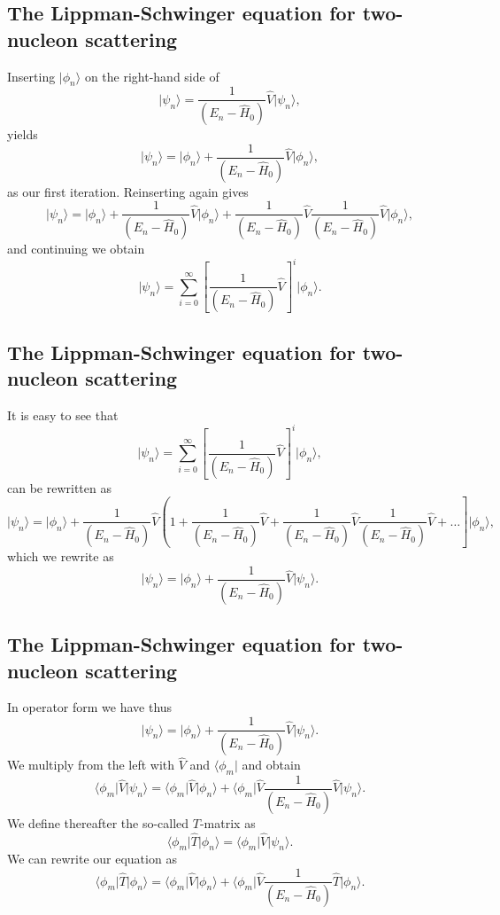 \documentclass[%
twoside,                 %
final,                   %
10pt]{article}
\begin{document}
\subsection{The Lippman-Schwinger equation for two-nucleon scattering}
\begin{block}{}
Inserting  $\vert\phi_n \rangle$  on the right-hand side of 
\[
\vert \psi_n \rangle =\frac{1}{( E_n -\hat{H}_0)}\hat{V}\vert \psi_n \rangle,
\]
yields
\[
\vert \psi_n \rangle =\vert\phi_n \rangle+\frac{1}{\left( E_n -\hat{H}_0\right)}\hat{V}\vert \phi_n \rangle,
\]
as our first iteration. 
Reinserting again gives
\[
\vert \psi_n \rangle =\vert\phi_n \rangle+\frac{1}{\left( E_n -\hat{H}_0\right)}\hat{V}\vert \phi_n \rangle+\frac{1}{( E_n -\hat{H}_0)}\hat{V}\frac{1}{\left( E_n -\hat{H}_0\right)}\hat{V}\vert \phi_n \rangle,
\]
and continuing we obtain
\[
\vert \psi_n \rangle =\sum_{i=0}^{\infty}\left[\frac{1}{( E_n -\hat{H}_0)}\hat{V}\right]^i\vert \phi_n \rangle.
\]
\end{block}

\subsection{The Lippman-Schwinger equation for two-nucleon scattering}
\begin{block}{}
It is easy to see that 
\[
\vert \psi_n \rangle =\sum_{i=0}^{\infty}\left[\frac{1}{(E_n -\hat{H}_0)}\hat{V}\right]^i\vert \phi_n \rangle,
\]
can be rewritten as 
\[
\vert \psi_n \rangle =\vert\phi_n \rangle+\frac{1}{( E_n -\hat{H}_0)}
\hat{V}\left(1+ \frac{1}{(E_n -\hat{H}_0)}\hat{V}+\frac{1}{(E_n -\hat{H}_0)}\hat{V}\frac{1}{(E_n -\hat{H}_0)}\hat{V}+\dots\right]\vert \phi_n \rangle,
\]
which we rewrite as 
\[
\vert \psi_n \rangle =\vert\phi_n \rangle+\frac{1}{(E_n -\hat{H}_0)}\hat{V}\vert \psi_n \rangle.
\]
\end{block}

\subsection{The Lippman-Schwinger equation for two-nucleon scattering}
\begin{block}{}
In operator form we have thus
\[
\vert \psi_n \rangle =\vert\phi_n \rangle+\frac{1}{(E_n -\hat{H}_0)}\hat{V}\vert \psi_n \rangle.
\]
We multiply from the left with $\hat{V}$ and $\langle \phi_m \vert$ and obtain
\[
\langle \phi_m \vert\hat{V}\vert \psi_n \rangle =\langle \phi_m \vert\hat{V}\vert\phi_n \rangle+\langle \phi_m \vert\hat{V}\frac{1}{(E_n -\hat{H}_0)}\hat{V}\vert \psi_n \rangle.
\]
We define thereafter the so-called $T$-matrix as
\[
\langle \phi_m \vert\hat{T}\vert \phi_n \rangle=\langle \phi_m \vert\hat{V}\vert \psi_n \rangle.
\]
We can rewrite our equation as
\[
\langle \phi_m \vert\hat{T}\vert \phi_n \rangle =\langle \phi_m \vert\hat{V}\vert\phi_n \rangle+\langle \phi_m \vert\hat{V}\frac{1}{(E_n -\hat{H}_0)}\hat{T}\vert \phi_n \rangle.
\]
\end{block}
\end{document}
